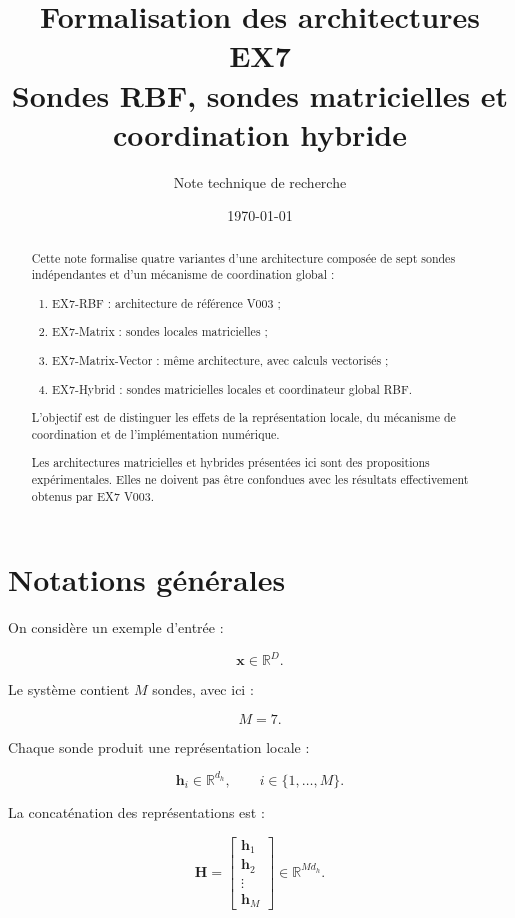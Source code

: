 \documentclass[11pt,a4paper]{article}
\title{
  \textbf{Formalisation des architectures EX7}\\
  \large Sondes RBF, sondes matricielles et coordination hybride
}
\author{Note technique de recherche}
\date{\today}
\begin{document}
\maketitle

\begin{abstract}
Cette note formalise quatre variantes d'une architecture composée
de sept sondes indépendantes et d'un mécanisme de coordination global :

\begin{enumerate}
  \item EX7-RBF : architecture de référence V003 ;
  \item EX7-Matrix : sondes locales matricielles ;
  \item EX7-Matrix-Vector : même architecture, avec calculs vectorisés ;
  \item EX7-Hybrid : sondes matricielles locales et coordinateur global RBF.
\end{enumerate}

L'objectif est de distinguer les effets de la représentation locale,
du mécanisme de coordination et de l'implémentation numérique.

Les architectures matricielles et hybrides présentées ici sont des
propositions expérimentales. Elles ne doivent pas être confondues
avec les résultats effectivement obtenus par EX7 V003.
\end{abstract}

\tableofcontents
\newpage

\section{Notations générales}

On considère un exemple d'entrée :

\[
  \bm{x}\in\mathbb{R}^{D}.
\]

Le système contient \(M\) sondes, avec ici :

\[
  M=7.
\]

Chaque sonde produit une représentation locale :

\[
  \bm{h}_i\in\mathbb{R}^{d_h},
  \qquad i\in\{1,\ldots,M\}.
\]

La concaténation des représentations est :

\[
  \bm{H}
  =
  \begin{bmatrix}
  \bm{h}_1\\
  \bm{h}_2\\
  \vdots\\
  \bm{h}_M
  \end{bmatrix}
  \in\mathbb{R}^{Md_h}.
\]
\end{document}
